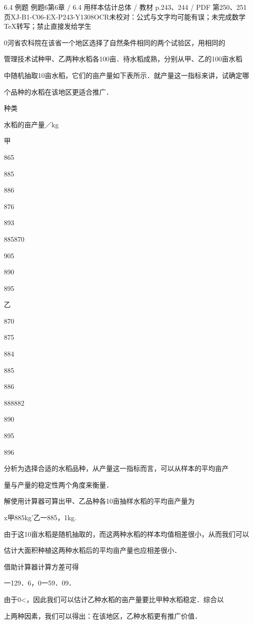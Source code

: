 \begin{bankitem}{6.4 例题 例题6}{第6章 / 6.4 用样本估计总体 / 教材 p.243、244 / PDF 第250、251页}{XJ-B1-C06-EX-P243-Y1308}{OCR未校对：公式与文字均可能有误；未完成数学TeX转写；禁止直接发给学生}
\begin{ocrdraft}
\par
0河省农科院在该省一个地区选择了自然条件相同的两个试验区，用相同的
\par
管理技术试种甲、乙两种水稻各100亩．待水稻成熟，分别从甲、乙的100亩水稻
\par
中随机抽取10亩水稻，它们的亩产量如下表所示．就产量这一指标来讲，试确定哪
\par
个品种的水稻在该地区更适合推广．
\par
种类
\par
水稻的亩产量／kg
\par
甲
\par
865
\par
885
\par
886
\par
876
\par
893
\par
885870
\par
905
\par
890
\par
895
\par
乙
\par
870
\par
875
\par
884
\par
885
\par
886
\par
888882
\par
890
\par
895
\par
896
\par
[教材p.244 / PDF第251页]
\par
分析为选择合适的水稻品种，从产量这一指标而言，可以从样本的平均亩产
\par
量与产量的稳定性两个角度来衡量．
\par
解使用计算器可算出甲、乙品种各10亩抽样水稻的平均亩产量为
\par
x甲885kg'乙一885，1kg.
\par
由于这10亩水稻是随机抽取的，而这两种水稻的样本均值相差很小，从而我们可以
\par
估计大面积种植这两种水稻后的平均亩产量也应相差很小．
\par
借助计算器计算方差可得
\par
一129．6，0一59．09．
\par
由于0<，因此我们可以估计乙种水稻的亩产量要比甲种水稻稳定．综合以
\par
上两种因素，我们可以得出：在该地区，乙种水稻更有推广价值．
\end{ocrdraft}
\end{bankitem}
